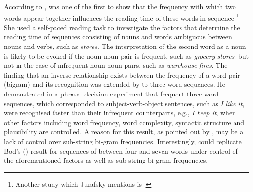 According to \citet[51]{jurafsky2003}, \citet{macdonald} was one of the first to show that the frequency with which two words appear together influences the reading time of these words in sequence.\footnote{Another study which Jurafsky mentions is \citet{trueswell-etal}.} She used a self-paced reading task to investigate the factors that determine the reading time of sequences consisting of nouns and words ambiguous between nouns and verbs, such as \textit{stores}. The interpretation of the second word as a noun is likely to be evoked if the noun-noun pair is frequent, such as \textit{grocery stores}, but not in the case of infrequent noun-noun pairs, such as \textit{warehouse fires}. The finding that an inverse relationship exists between the frequency of a word-pair (bigram) and its recognition was extended by \citet{bod2000} to three-word sequences. He demonstrated in a phrasal decision experiment that frequent three-word sequences, which corresponded to subject-verb-object sentences, such as \textit{I like it}, were recognised faster than their infrequent counterparts, e.g., \textit{I keep it}, when other factors including word frequency, word complexity, syntactic structure and plausibility are controlled. A reason for this result, as pointed out by \citet[62]{jurafsky2003}, may be a lack of control over sub-string bi-gram frequencies. Interestingly, \citet{bannard-ramscar} could replicate Bod's (\citeyear{bod2000}) result for sequences of between four and seven words under control of the aforementioned factors as well as sub-string bi-gram frequencies.

